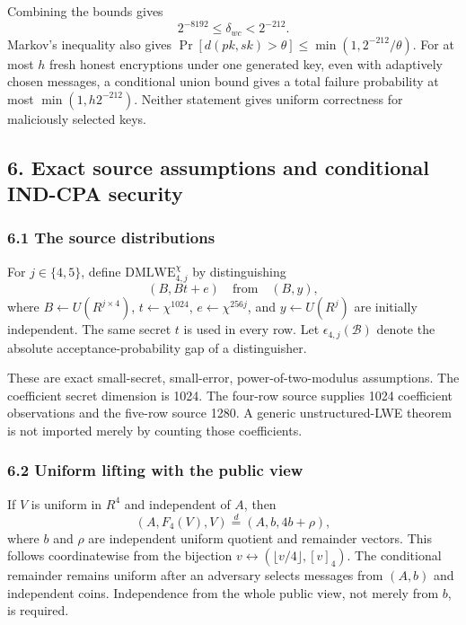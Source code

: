 \documentclass[
  10pt,
  a4paper,
]{article}
\begin{document}
Combining the bounds gives \[
\boxed{2^{-8192}\le\delta_{wc}<2^{-212}.}
\] Markov's inequality also gives
\(\Pr[d(pk,sk)>\theta]\le\min(1,2^{-212}/\theta)\). For at most \(h\)
fresh honest encryptions under one generated key, even with adaptively
chosen messages, a conditional union bound gives a total failure
probability at most \(\min(1,h2^{-212})\). Neither statement gives
uniform correctness for maliciously selected keys.

\subsection{6. Exact source assumptions and conditional IND-CPA
security}\label{exact-source-assumptions-and-conditional-ind-cpa-security}

\subsubsection{6.1 The source
distributions}\label{the-source-distributions}

For \(j\in\{4,5\}\), define \(\mathrm{DMLWE}_{4,j}^{\chi}\) by
distinguishing \[
(B,Bt+e)
\quad\text{from}\quad(B,y),
\] where \(B\leftarrow U(R^{j\times4})\), \(t\leftarrow\chi^{1024}\),
\(e\leftarrow\chi^{256j}\), and \(y\leftarrow U(R^j)\) are initially
independent. The same secret \(t\) is used in every row. Let
\(\epsilon_{4,j}(\mathcal B)\) denote the absolute
acceptance-probability gap of a distinguisher.

These are exact small-secret, small-error, power-of-two-modulus
assumptions. The coefficient secret dimension is 1024. The four-row
source supplies 1024 coefficient observations and the five-row source
1280. A generic unstructured-LWE theorem is not imported merely by
counting those coefficients.

\subsubsection{6.2 Uniform lifting with the public
view}\label{uniform-lifting-with-the-public-view}

If \(V\) is uniform in \(R^4\) and independent of \(A\), then \[
(A,F_4(V),V)\overset d=
(A,b,4b+\rho),
\] where \(b\) and \(\rho\) are independent uniform quotient and
remainder vectors. This follows coordinatewise from the bijection
\(v\leftrightarrow(\lfloor v/4\rfloor,[v]_4)\). The conditional
remainder remains uniform after an adversary selects messages from
\((A,b)\) and independent coins. Independence from the whole public
view, not merely from \(b\), is required.
\end{document}

